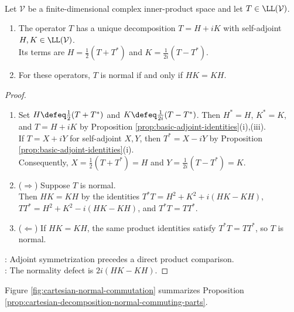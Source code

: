 \begin{proposition} \label{prop:cartesian-decomposition-normal-commuting-parts} \\
Let $\mathcal{V}$ be a finite-dimensional complex inner-product space and let $T\in\LL(\mathcal{V})$.
\begin{enumerate}[label=(\roman*)]
\setlength{\itemsep}{0pt}
\item The operator $T$ has a unique decomposition $T=H+iK$ with self-adjoint $H,K\in\LL(\mathcal{V})$.\\
Its terms are $H=\frac{1}{2}(T+T^*)$ and $K=\frac{1}{2i}(T-T^*)$.
\item For these operators, $T$ is normal if and only if $HK=KH$.
\end{enumerate}
\begin{proof}
\begin{enumerate}[label=(\roman*)]
\setlength{\itemsep}{0pt}
\item[$(i)$] Set $H\defeq\frac{1}{2}(T+T^*)$ and $K\defeq\frac{1}{2i}(T-T^*)$. Then $H^*=H$, $K^*=K$, and $T=H+iK$ by Proposition \ref{prop:basic-adjoint-identities}(i),(iii).\\
If $T=X+iY$ for self-adjoint $X,Y$, then $T^*=X-iY$ by Proposition \ref{prop:basic-adjoint-identities}(i).\\
Consequently, $X=\frac{1}{2}(T+T^*)=H$ and $Y=\frac{1}{2i}(T-T^*)=K$.
\item[$(ii)$] ($\Rightarrow$) Suppose $T$ is normal.\\
Then $HK=KH$ by the identities $T^*T=H^2+K^2+i(HK-KH)$, $TT^*=H^2+K^2-i(HK-KH)$, and $T^*T=TT^*$.
\item[$(ii)$] ($\Leftarrow$) If $HK=KH$, the same product identities satisfy $T^*T=TT^*$, so $T$ is normal.
\end{enumerate}
: Adjoint symmetrization precedes a direct product comparison.\\
: The normality defect is $2i(HK-KH)$.
\end{proof}
\end{proposition}

Figure \ref{fig:cartesian-normal-commutation} summarizes Proposition \ref{prop:cartesian-decomposition-normal-commuting-parts}.

\begin{illustrationfigure}[H]
  \centering
  
  \caption{Cartesian decomposition: $T$ is normal exactly when $HK=KH$.}
  \label{fig:cartesian-normal-commutation}
\end{illustrationfigure}


